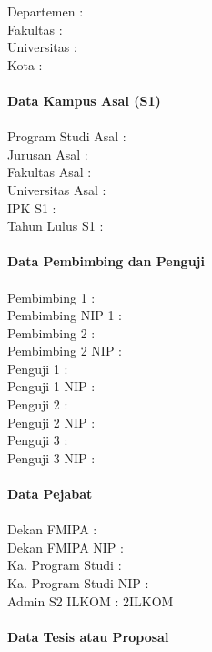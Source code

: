 \begin{center}
\begin{tabbing}
	Departemen				\>	: \@dept \\
	Fakultas				\>	: \@faculty \\
	Universitas				\>	: \@university \\
	Kota					\>	: \@city \\
	\HRule	\\
	{\bfseries Data Kampus Asal (S1)}	\\
	\HRule 	\\
	Program Studi Asal		\>	: \@prodiasal \\
	Jurusan Asal			\>	: \@jurusanasal \\
	Fakultas Asal			\>	: \@facultyasal \\
	Universitas Asal		\>	: \@universityasal \\
	IPK S1					\>	: \@ipkasal \\
	Tahun Lulus S1			\>	: \@tahunlulusasal \\
	\HRule	\\
	{\bfseries Data Pembimbing dan Penguji}	\\
	\HRule 	\\
	Pembimbing 1			\> 	: \@firstsupervisor \\
	Pembimbing NIP 1		\>	: \@firstsupervisornip \\
	Pembimbing 2			\>	: \@secondsupervisor \\
	Pembimbing 2 NIP		\>	: \@secondsupervisornip \\
	Penguji 1				\>	: \@firstexaminer \\
	Penguji 1 NIP			\>	: \@firstexaminernip \\
	Penguji 2				\>	: \@secondexaminer \\
	Penguji 2 NIP			\>	: \@secondexaminernip \\
	Penguji 3				\>	: \@thirdexaminer \\
	Penguji 3 NIP			\>	: \@thirdexaminernip \\
	\HRule	\\
	{\bfseries Data Pejabat}	\\
	\HRule 	\\
	Dekan FMIPA				\>	: \@headdept \\
	Dekan FMIPA NIP			\>	: \@headdeptnip \\
	Ka. Program Studi		\>	: \@headprogram \\
	Ka. Program Studi NIP	\>	: \@headprogramnip \\
	Admin S2 ILKOM			\>	: \@adminS2ILKOM \\ [3cm]
	\HRule	\\
	{\bfseries Data Tesis atau Proposal}	\\

\end{tabbing}
\end{center}
